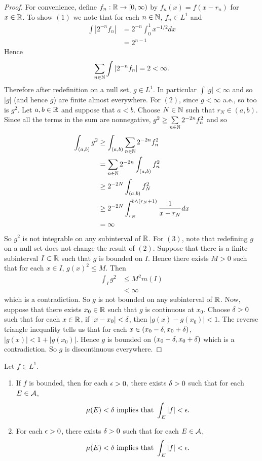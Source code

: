 \documentclass{book}
\begin{document}
	\begin{proof} For convenience, define $f_n: \mathbb{R} \rightarrow [0,\infty)$ by $f_n(x) = f(x-r_n)$ for $x \in \mathbb{R}$.
		To show $(1)$ we note that for each $n \in \mathbb{N}$, $f_n \in L^1$ and
		\begin{align*}
			\int |2^{-n} f_n| 
			&= 2^{-n}\int_0^1 x^{-1/2}dx\\ 
			&= 2^{n-1}
		\end{align*}
		Hence 
		$$\sum\limits_{n \in \mathbb{N}} \int |2^{-n} f_n| = 2 < \infty.$$
		Therefore after redefinition on a null set, $g \in L^1.$ In particular $\int |g| < \infty$ and so $|g|$ (and hence $g$) are finite almost everywhere. For $(2)$, since $g < \infty$ a.e., so too is $g^{2}$. Let $a,b \in \mathbb{R}$ and suppose that $a<b$. Choose $N \in \mathbb{N}$ such that $r_N \in (a,b)$. Since all the terms in the sum are nonnegative, $g^{2} \geq \sum\limits_{n \in \mathbb{N}} 2^{-2n}f_n^2$ and so 
		\begin{align*}
			\int_{(a,b)} g^2 
			&\geq \int_{(a,b)} \sum\limits_{n \in \mathbb{N}} 2^{-2n}f_n^2\\
			&= \sum\limits_{n \in \mathbb{N}} 2^{-2n} \int_{(a,b)} f_n^2\\
			&\geq 2^{-2N} \int_{(a,b)} f_N^2\\
			&\geq 2^{-2N} \int_{r_N}^{b \wedge (r_N+1)} \frac{1}{x-r_N} dx\\
			&= \infty
		\end{align*}
		So $g^2$ is not integrable on any subinterval of $\mathbb{R}$. For $(3)$, note that redefining $g$ on a null set does not change the result of $(2)$. Suppose that there is a finite subinterval $I \subset \mathbb{R}$ such that $g$ is bounded on $I$. Hence there exists $M >0$ such that for each $x \in I$, $g(x)^2 \leq M$. Then 
		\begin{align*}
			\int_I g^2
			&\leq M^2 m(I)\\
			&< \infty
		\end{align*}
		which is a contradiction. So $g$ is not bounded on any subinterval of $\mathbb{R}$. Now, suppose that there exists $x_0 \in \mathbb{R}$ such that $g$ is continuous at $x_0$. Choose $\delta > 0$ such that for each $x \in \mathbb{R}$, if $|x-x_0|< \delta$, then $|g(x) - g(x_0)| < 1$. The reverse triangle inequality tells us that for each $x \in (x_0-\delta, x_0 +\delta)$, $|g(x)| < 1 + |g(x_0)|$. Hence $g$ is bounded on $(x_0-\delta, x_0 +\delta)$ which is a contradiction. So $g$ is discontinuous everywhere.
	\end{proof}
	
	\begin{ex}  
		Let $f \in L^1$. 
		\begin{enumerate}
			\item If $f$ is bounded, then for each $\epsilon >0$, there exists $\delta >0$ such that for each $E \in \mathcal{A}$,  
			$$\mu(E) < \delta \text{ implies that } \int_E |f| < \epsilon .$$
			\item For each $\epsilon >0$, there exists $\delta >0$ such that for each $E \in \mathcal{A}$,  
			$$\mu(E) < \delta \text{ implies that } \int_E |f| < \epsilon .$$
		\end{enumerate} 
	\end{ex}
	
\end{document}
